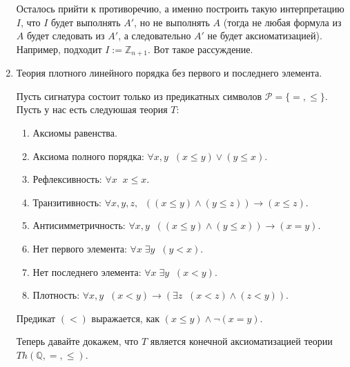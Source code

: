 \begin{example}
\begin{enumerate}
        Осталось прийти к противоречию, а именно построить такую интерпретацию $I$, что $I$ будет выполнять $A'$, но не выполнять $A$ (тогда не любая формула из $A$ будет следовать из $A'$, а следовательно $A'$ не будет аксиоматизацией). Например, подходит $I := \mathbb{Z}_{n + 1}$. Вот такое рассуждение.
        
        \item Теория плотного линейного порядка без первого и последнего элемента.
        

        Пусть сигнатура состоит только из предикатных символов $\mathcal{P} = \{ =, \leqslant \}$. Пусть у нас есть следуюшая теория $T$: \begin{enumerate}
            \item Аксиомы равенства.
            \item Аксиома полного порядка: $\forall x, y \;\; (x \leqslant y) \lor (y \leqslant x)$.
            \item Рефлексивность: $\forall x \;\; x \leqslant x$.
            \item Транзитивность: $\forall x, y, z, \;\; ((x \leqslant y) \land (y \leqslant z)) \to (x \leqslant z)$.
            \item Антисимметричность: $\forall x, y \;\; ((x \leqslant y) \land (y \leqslant x)) \to (x = y)$.
            \item Нет первого элемента: $\forall x \; \exists y \;\; (y < x)$.
            \item Нет последнего элемента: $\forall x \; \exists y \;\; (x < y)$.
            \item Плотность: $\forall x, y \;\; (x < y) \to (\exists z \;\; (x < z) \land (z < y))$.
        \end{enumerate}
        Предикат $(<)$  выражается, как $(x \leqslant y) \land \lnot(x = y)$.

        Теперь давайте докажем, что $T$ является конечной аксиоматизацией теории $Th(\mathbb{Q}, =, \leqslant)$.


\end{enumerate}
\end{example}
